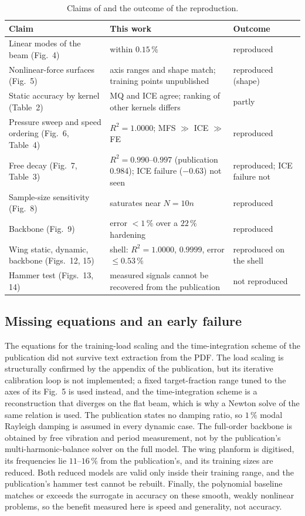 \begin{table}[tbp]
\centering\footnotesize
\caption{Claims of \citet{he2023mfsnlrom} and the outcome of the reproduction.}\label{tab:vf-mfs-cmp}
\begin{tabularx}{\linewidth}{@{}>{\raggedright\arraybackslash}p{4.1cm} >{\raggedright\arraybackslash}X >{\raggedright\arraybackslash}p{2.3cm}@{}}
\toprule
Claim & This work & Outcome\\
\midrule
Linear modes of the beam (Fig.~4) & within $0.15\,\%$ & reproduced\\
Nonlinear-force surfaces (Fig.~5) & axis ranges and shape match; training points unpublished & reproduced (shape)\\
Static accuracy by kernel (Table~2) & MQ and ICE agree; ranking of other kernels differs & partly\\
Pressure sweep and speed ordering (Fig.~6, Table~4) & $R^2=1.0000$; MFS $\gg$ ICE $\gg$ FE & reproduced\\
Free decay (Fig.~7, Table~3) & $R^2=0.990$--$0.997$ (publication 0.984); ICE failure ($-0.63$) not seen & reproduced; ICE failure not\\
Sample-size sensitivity (Fig.~8) & saturates near $N=10n$ & reproduced\\
Backbone (Fig.~9) & error $<1\,\%$ over a $22\,\%$ hardening & reproduced\\
Wing static, dynamic, backbone (Figs.~12, 15) & shell: $R^2=1.0000$, $0.9999$, error $\le0.53\,\%$ & reproduced on the shell\\
Hammer test (Figs.~13, 14) & measured signals cannot be recovered from the publication & not reproduced\\
\bottomrule
\end{tabularx}
\end{table}

\subsection*{Missing equations and an early failure}

The equations for the training-load scaling and the time-integration scheme of the publication did not survive text extraction from the PDF. The load scaling is structurally confirmed by the appendix of the publication, but its iterative calibration loop is not implemented; a fixed target-fraction range tuned to the axes of its Fig.~5 is used instead, and the time-integration scheme is a reconstruction that diverges on the flat beam, which is why a Newton solve of the same relation is used. The publication states no damping ratio, so $1\,\%$ modal Rayleigh damping is assumed in every dynamic case. The full-order backbone is obtained by free vibration and period measurement, not by the publication's multi-harmonic-balance solver on the full model. The wing planform is digitised, its frequencies lie $11$--$16\,\%$ from the publication's, and its training sizes are reduced. Both reduced models are valid only inside their training range, and the publication's hammer test cannot be rebuilt. Finally, the polynomial baseline matches or exceeds the surrogate in accuracy on these smooth, weakly nonlinear problems, so the benefit measured here is speed and generality, not accuracy.

